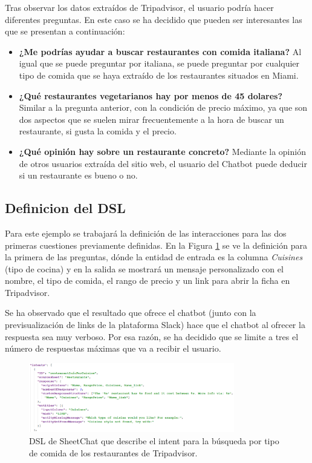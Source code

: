 Tras observar los datos extraídos de Tripadvisor, el usuario podría hacer diferentes preguntas. En este caso se ha decidido que pueden ser interesantes las que se presentan a continuación:
\begin{itemize}
	\item \textbf{¿Me podrías ayudar a buscar restaurantes con comida italiana?} Al igual que se puede preguntar por italiana, se puede preguntar por cualquier tipo de comida que se haya extraído de los restaurantes situados en Miami.
	\item \textbf{¿Qué restaurantes vegetarianos hay por menos de 45 dolares?} Similar a la pregunta anterior, con la condición de precio máximo, ya que son dos aspectos que se suelen mirar frecuentemente a la hora de buscar un restaurante, si gusta la comida y el precio.
	\item \textbf{¿Qué opinión hay sobre un restaurante concreto?} Mediante la opinión de otros usuarios extraída del sitio web, el usuario del Chatbot puede deducir si un restaurante es bueno o no.
\end{itemize}

\subsection{Definicion del DSL}
\label{sec:DSLTripadvisor}

Para este ejemplo se trabajará la definición de las interacciones para las dos primeras cuestiones previamente definidas. En la Figura \ref{fig:DSLTripadvisor1} se ve la definición para la primera de las preguntas, dónde la entidad de entrada es la columna \emph{Cuisines} (tipo de cocina) y en la salida se mostrará un mensaje personalizado con el nombre, el tipo de comida, el rango de precio y un link para abrir la ficha en Tripadvisor.

Se ha observado que el resultado que ofrece el chatbot (junto con la previsualización de links de la plataforma Slack) hace que el chatbot al ofrecer la respuesta sea muy verboso. Por esa razón, se ha decidido que se limite a tres el número de respuestas máximas que va a recibir el usuario.

\begin{figure}[htb]
	\centering
	\includegraphics[width=0.8\textwidth]{./figs/DSLTripadvisor1.png}
	\caption{DSL de SheetChat que describe el intent para la búsqueda por tipo de comida de los restaurantes de Tripadvisor.}
	\label{fig:DSLTripadvisor1}
\end{figure}


